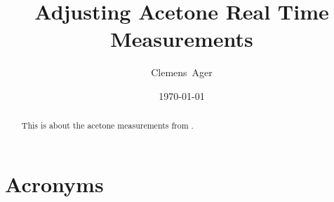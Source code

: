 \documentclass[twocolumn]{article}
\title{Adjusting Acetone Real Time Measurements}
\author{Clemens~Ager}
\date{\today}
\begin{document}
\maketitle

\begin{abstract}
  This is about the acetone measurements from .
\end{abstract}


\setcounter{tocdepth}{2}
\tableofcontents






\appendix 
\section{Acronyms}


\printbibliography{}
\end{document}
